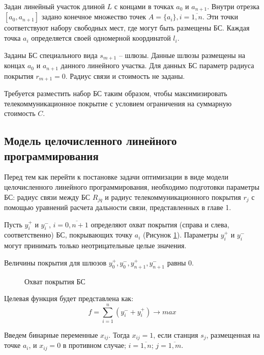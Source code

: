 Задан линейный участок длиной $L$ с концами в точках $a_0$ и $a_{n+1}$. Внутри  отрезка $[a_0, a_{n+1}]$ задано конечное множество точек $A=\{a_i\}, i=\overline{1,n}$. Эти точки соответствуют набору свободных мест, где могут быть размещены БС. Каждая точка $a_i$ определяется своей одномерной координатой $l_i$.

Заданы БС специального вида $s_{m+1}$ -- шлюзы. Данные шлюзы размещены на концах $a_0$ и $a_{n+1}$ данного линейного участка. Для данных БС параметр радиуса покрытия $r_{m+1}=0$. Радиус связи и стоимость не заданы.

Требуется разместить набор БС таким образом, чтобы максимизировать телекоммуникационное покрытие с условием ограничения на суммарную стоимость $C$.


\subsection{Модель целочисленного линейного программирования}

Перед тем как перейти к постановке задачи оптимизации в виде модели целочисленного линейного программирования, необходимо подготовки параметры БС: радиус связи между БС $R_{jq}$ и радиус телекоммуникационного покрытия $r_j$ с помощью уравнений расчета дальности связи, представленных в главе 1.



Пусть $y_i^+$ и $y_i^-$, $i= \overline{0,n+1}$ определяют охват покрытия (справа и слева, соответственно) БС, покрывающих точку $a_i$ (Рисунок \cref{fig:part3_station_coverage}). Параметры $y_i^+$ и $y_i^-$ могут принимать только неотрицательные целые значения.

Величины  покрытия для шлюзов $y_0^+, y_0^-, y_{n+1}^+, y_{n+1}^-$ равны 0.

\begin{figure}[ht]
  \caption{Охват покрытия БС}\label{fig:part3_station_coverage}
\end{figure}
 
Целевая функция будет представлена как:
\begin{equation}
  \label{eq:part3_objective_function}
  f =  \sum\limits_{i=1}^n (y_i^- + y_i^+) \rightarrow max
\end{equation}

Введем бинарные переменные $x_{ij}$. Тогда $x_{ij}=1$, если станция $s_j$, размещенная на точке $a_i$, и $x_{ij}=0$ в противном случае; $i= \overline{1, n}$; $j = \overline{1,m}$.

